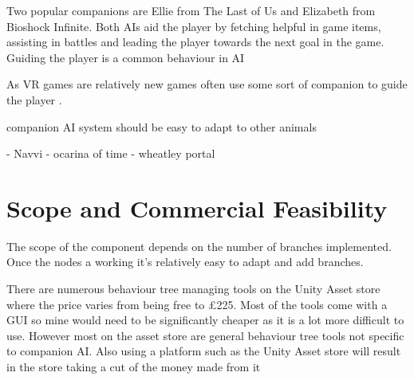 \documentclass{scrartcl}
\begin{document}
Two popular companions are Ellie from The Last of Us and Elizabeth from Bioshock Infinite. Both AIs aid the player by fetching helpful in game items, assisting in battles and leading the player towards the next goal in the game.
Guiding the player is a common behaviour in AI 


As VR games are relatively new games often use some sort of companion to guide the player \cite{RobinsonVR} .


companion AI system 
should be easy to adapt to other animals

- Navvi - ocarina of time
- wheatley portal



\section{Scope and Commercial Feasibility}
The scope of the component depends on the number of branches implemented. Once the nodes a working it's relatively easy to adapt and add branches.

There are numerous behaviour tree managing tools on the Unity Asset store where the price varies from being free to \pounds225. Most of the tools come with a GUI so mine would need to be significantly cheaper as it is a lot more difficult to use. However most on the asset store are general behaviour tree tools not specific to companion AI.
Also using a platform such as the Unity Asset store will result in the store taking a cut of the money made from it 



	
\end{document}
